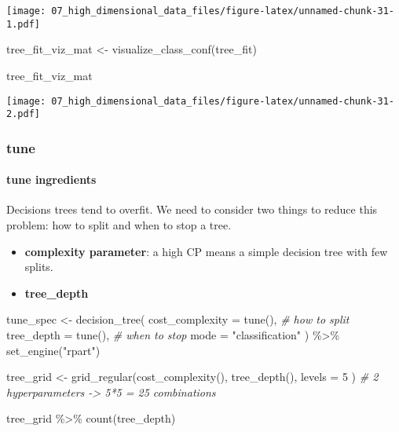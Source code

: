 \documentclass[
]{book}
\newenvironment{Shaded}{\begin{snugshade}}{\end{snugshade}}
\newcommand{\AttributeTok}[1]{\textcolor[rgb]{0.77,0.63,0.00}{#1}}
\newcommand{\CommentTok}[1]{\textcolor[rgb]{0.56,0.35,0.01}{\textit{#1}}}
\newcommand{\DecValTok}[1]{\textcolor[rgb]{0.00,0.00,0.81}{#1}}
\newcommand{\FunctionTok}[1]{\textcolor[rgb]{0.00,0.00,0.00}{#1}}
\newcommand{\NormalTok}[1]{#1}
\newcommand{\OtherTok}[1]{\textcolor[rgb]{0.56,0.35,0.01}{#1}}
\newcommand{\SpecialCharTok}[1]{\textcolor[rgb]{0.00,0.00,0.00}{#1}}
\newcommand{\StringTok}[1]{\textcolor[rgb]{0.31,0.60,0.02}{#1}}
\begin{document}
\texttt{[image: 07\_high\_dimensional\_data\_files/figure-latex/unnamed-chunk-31-1.pdf]}

\begin{Shaded}
\begin{Highlighting}[]
\NormalTok{tree\_fit\_viz\_mat }\OtherTok{\textless{}{-}} \FunctionTok{visualize\_class\_conf}\NormalTok{(tree\_fit)}

\NormalTok{tree\_fit\_viz\_mat}
\end{Highlighting}
\end{Shaded}

\texttt{[image: 07\_high\_dimensional\_data\_files/figure-latex/unnamed-chunk-31-2.pdf]}

\hypertarget{tune-1}{%
\subsubsection{tune}\label{tune-1}}

\hypertarget{tune-ingredients-1}{%
\paragraph{tune ingredients}\label{tune-ingredients-1}}

Decisions trees tend to overfit. We need to consider two things to reduce this problem: how to split and when to stop a tree.

\begin{itemize}
\item
  \textbf{complexity parameter}: a high CP means a simple decision tree with few splits.
\item
  \textbf{tree\_depth}
\end{itemize}

\begin{Shaded}
\begin{Highlighting}[]
\NormalTok{tune\_spec }\OtherTok{\textless{}{-}} \FunctionTok{decision\_tree}\NormalTok{(}
  \AttributeTok{cost\_complexity =} \FunctionTok{tune}\NormalTok{(), }\CommentTok{\# how to split}
  \AttributeTok{tree\_depth =} \FunctionTok{tune}\NormalTok{(), }\CommentTok{\# when to stop}
  \AttributeTok{mode =} \StringTok{"classification"}
\NormalTok{) }\SpecialCharTok{\%\textgreater{}\%}
  \FunctionTok{set\_engine}\NormalTok{(}\StringTok{"rpart"}\NormalTok{)}

\NormalTok{tree\_grid }\OtherTok{\textless{}{-}} \FunctionTok{grid\_regular}\NormalTok{(}\FunctionTok{cost\_complexity}\NormalTok{(),}
  \FunctionTok{tree\_depth}\NormalTok{(),}
  \AttributeTok{levels =} \DecValTok{5}
\NormalTok{) }\CommentTok{\# 2 hyperparameters {-}\textgreater{} 5*5 = 25 combinations}

\NormalTok{tree\_grid }\SpecialCharTok{\%\textgreater{}\%}
  \FunctionTok{count}\NormalTok{(tree\_depth)}
\end{Highlighting}
\end{Shaded}
\end{document}
